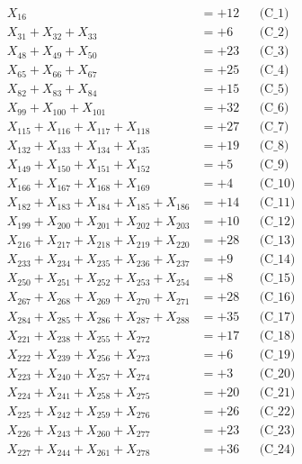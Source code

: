 \documentclass[a4paper,10pt]{article}
\begin{document}
\allowdisplaybreaks
{\small
\begin{align}
X_{16} &= +12 && \text{(C\_1)} \\
X_{31} + X_{32} + X_{33} &= +6 && \text{(C\_2)} \\
X_{48} + X_{49} + X_{50} &= +23 && \text{(C\_3)} \\
X_{65} + X_{66} + X_{67} &= +25 && \text{(C\_4)} \\
X_{82} + X_{83} + X_{84} &= +15 && \text{(C\_5)} \\
\allowbreak
X_{99} + X_{100} + X_{101} &= +32 && \text{(C\_6)} \\
X_{115} + X_{116} + X_{117} + X_{118} &= +27 && \text{(C\_7)} \\
X_{132} + X_{133} + X_{134} + X_{135} &= +19 && \text{(C\_8)} \\
X_{149} + X_{150} + X_{151} + X_{152} &= +5 && \text{(C\_9)} \\
X_{166} + X_{167} + X_{168} + X_{169} &= +4 && \text{(C\_10)} \\
\allowbreak
X_{182} + X_{183} + X_{184} + X_{185} + X_{186} &= +14 && \text{(C\_11)} \\
X_{199} + X_{200} + X_{201} + X_{202} + X_{203} &= +10 && \text{(C\_12)} \\
X_{216} + X_{217} + X_{218} + X_{219} + X_{220} &= +28 && \text{(C\_13)} \\
X_{233} + X_{234} + X_{235} + X_{236} + X_{237} &= +9 && \text{(C\_14)} \\
X_{250} + X_{251} + X_{252} + X_{253} + X_{254} &= +8 && \text{(C\_15)} \\
\allowbreak
X_{267} + X_{268} + X_{269} + X_{270} + X_{271} &= +28 && \text{(C\_16)} \\
X_{284} + X_{285} + X_{286} + X_{287} + X_{288} &= +35 && \text{(C\_17)} \\
X_{221} + X_{238} + X_{255} + X_{272} &= +17 && \text{(C\_18)} \\
X_{222} + X_{239} + X_{256} + X_{273} &= +6 && \text{(C\_19)} \\
X_{223} + X_{240} + X_{257} + X_{274} &= +3 && \text{(C\_20)} \\
\allowbreak
X_{224} + X_{241} + X_{258} + X_{275} &= +20 && \text{(C\_21)} \\
X_{225} + X_{242} + X_{259} + X_{276} &= +26 && \text{(C\_22)} \\
X_{226} + X_{243} + X_{260} + X_{277} &= +23 && \text{(C\_23)} \\
X_{227} + X_{244} + X_{261} + X_{278} &= +36 && \text{(C\_24)} \\

\end{align}}
\end{document}
